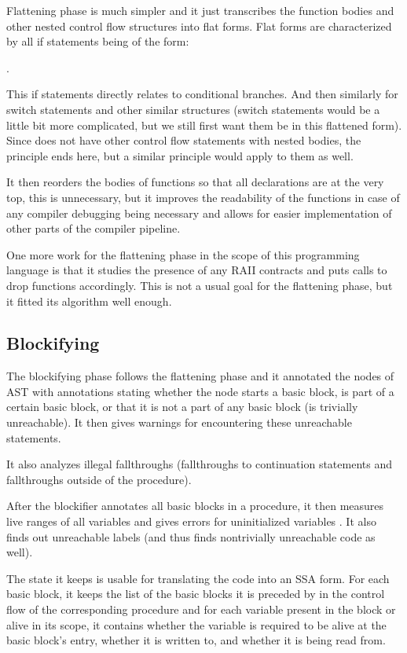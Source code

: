 Flattening phase is much simpler and it just transcribes the function bodies and other nested control flow structures into flat forms. Flat forms are characterized by all if statements being of the form:

.

This if statements directly relates to conditional branches. And then similarly for switch statements and other similar structures (switch statements would be a little bit more complicated, but we still first want them be in this flattened form). Since \cmm does not have other control flow statements with nested bodies, the principle ends here, but a similar principle would apply to them as well.

It then reorders the bodies of functions so that all declarations are at the very top, this is unnecessary, but it improves the readability of the functions in case of any compiler debugging being necessary and allows for easier implementation of other parts of the compiler pipeline.

One more work for the flattening phase in the scope of this programming language is that it studies the presence of any RAII contracts and puts calls to drop functions accordingly. This is not a usual goal for the flattening phase, but it fitted its algorithm well enough.

\subsection{Blockifying}

The blockifying phase follows the flattening phase and it annotated the nodes of AST with annotations stating whether the node starts a basic block, is part of a certain basic block, or that it is not a part of any basic block (is trivially unreachable). It then gives warnings for encountering these unreachable statements.

It also analyzes illegal fallthroughs (fallthroughs to continuation statements and fallthroughs outside of the procedure).



After the blockifier annotates all basic blocks in a procedure, it then measures live ranges of all variables and gives errors for uninitialized variables . It also finds out unreachable labels (and thus finds nontrivially unreachable code as well).

The state it keeps is usable for translating the code into an SSA form. For each basic block, it keeps the list of the basic blocks it is preceded by in the control flow of the corresponding procedure and for each variable present in the block or alive in its scope, it contains whether the variable is required to be alive at the basic block's entry, whether it is written to, and whether it is being read from.

